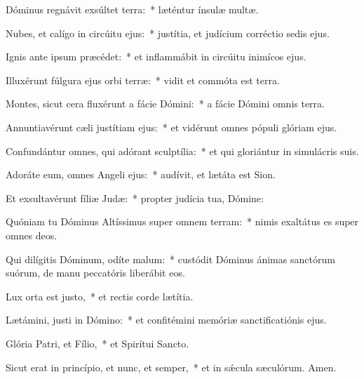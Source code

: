 \item Dóminus regnávit exsúltet terra:~* læténtur ínsulæ multæ.

\item Nubes, et calígo in circúitu ejus:~* justítia, et judícium corréctio sedis ejus.

\item Ignis ante ipsum præcédet:~* et inflammábit in circúitu inimícos ejus.

\item Illuxérunt fúlgura ejus orbi terræ:~* vidit et commóta est terra.

\item Montes, sicut cera fluxérunt a fácie Dómini:~* a fácie Dómini omnis terra.

\item Annuntiavérunt cæli justítiam ejus:~* et vidérunt omnes pópuli glóriam ejus.

\item Confundántur omnes, qui adórant sculptília:~* et qui gloriántur in simulácris suis.

\item Adoráte eum, omnes Angeli ejus:~* audívit, et lætáta est Sion.

\item Et exsultavérunt fíliæ Judæ:~* propter judícia tua, Dómine:

\item Quóniam tu Dóminus Altíssimus super omnem terram:~* nimis exaltátus es super omnes deos.

\item Qui dilígitis Dóminum, odíte malum:~* custódit Dóminus ánimas sanctórum suórum, de manu peccatóris liberábit eos.

\item Lux orta est justo,~* et rectis corde lætítia.

\item Lætámini, justi in Dómino:~* et confitémini memóriæ sanctificatiónis ejus.

\item Glória Patri, et Fílio,~* et Spirítui Sancto.

\item Sicut erat in princípio, et nunc, et semper,~* et in sǽcula sæculórum. Amen.

